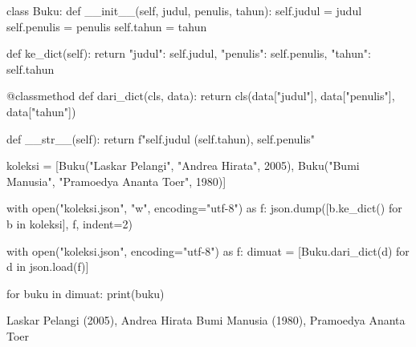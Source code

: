 \begin{kode}
class Buku:
    def __init__(self, judul, penulis, tahun):
        self.judul = judul
        self.penulis = penulis
        self.tahun = tahun

    def ke_dict(self):
        return {"judul": self.judul, "penulis": self.penulis,
                "tahun": self.tahun}

    @classmethod
    def dari_dict(cls, data):
        return cls(data["judul"], data["penulis"], data["tahun"])

    def __str__(self):
        return f"{self.judul} ({self.tahun}), {self.penulis}"

koleksi = [Buku("Laskar Pelangi", "Andrea Hirata", 2005),
           Buku("Bumi Manusia", "Pramoedya Ananta Toer", 1980)]

with open("koleksi.json", "w", encoding="utf-8") as f:
    json.dump([b.ke_dict() for b in koleksi], f, indent=2)

with open("koleksi.json", encoding="utf-8") as f:
    dimuat = [Buku.dari_dict(d) for d in json.load(f)]

for buku in dimuat:
    print(buku)
\end{kode}

\begin{keluaran}
Laskar Pelangi (2005), Andrea Hirata
Bumi Manusia (1980), Pramoedya Ananta Toer
\end{keluaran}


